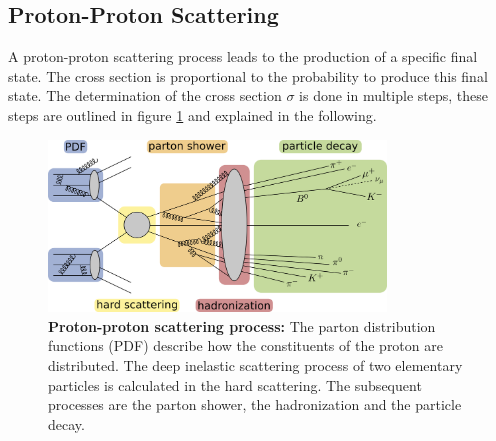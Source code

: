 \subsection{Proton-Proton Scattering}
A proton-proton scattering process leads to the production of a specific final state. The cross section is proportional to the probability to produce this final state. The determination of the cross section $\sigma$ is done in multiple steps, these steps are outlined in figure \ref{fig:ch_3_scattering} and explained in the following.

\begin{figure}
\centering
\includegraphics[width=0.8\textwidth]{assets/scattering.png}
\caption[Proton-Proton Scattering Process]{\textbf{Proton-proton scattering process:} The parton distribution functions (PDF) describe how the constituents of the proton are distributed. The deep inelastic scattering process of two elementary particles is calculated in the hard scattering. The subsequent processes are the parton shower, the hadronization and the particle decay.}
\label{fig:ch_3_scattering}
\end{figure}

